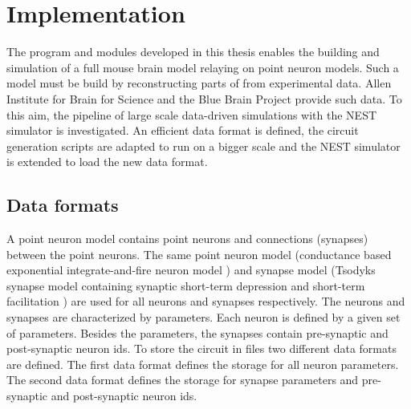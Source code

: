 %

\chapter{Implementation}

The program and modules developed in this thesis enables the building and simulation
of a full mouse brain model relaying on point neuron models. Such a model must be build by
reconstructing parts of from experimental data.
Allen Institute for Brain for Science and the Blue Brain Project provide such data.
To this aim, the pipeline of large scale data-driven simulations with the NEST simulator is investigated.
An efficient data format is defined, the circuit generation scripts are adapted to
run on a bigger scale and the NEST simulator is extended to load the new data format.

\section{Data formats}
\label{sec:dataformats}
A point neuron model contains point neurons and connections (synapses) between the point neurons.
The same point neuron model (conductance based exponential integrate-and-fire neuron model \cite{brette2005adaptive}) and synapse model (Tsodyks synapse model containing synaptic short-term depression and short-term facilitation \cite{tsodyks1997neural, fuhrmann2002coding}) are used for all neurons and synapses respectively.
The neurons and synapses are characterized by parameters.
Each neuron is defined by a given set of parameters.
Besides the parameters, the synapses contain pre-synaptic and post-synaptic neuron ids.
To store the circuit in files two different data formats are defined.
The first data format defines the storage for all neuron parameters.
The second data format defines the storage for synapse parameters and pre-synaptic and post-synaptic neuron ids.


